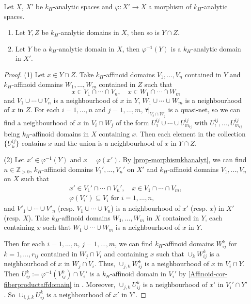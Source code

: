\begin{proposition}\label{prop-analyticdomainprop}
    Let $X$, $X'$ be $k_H$-analytic spaces and $\varphi:X'\rightarrow X$ a morphism of $k_H$-analytic spaces. 
    \begin{enumerate}
        \item Let $Y,Z$ be $k_H$-analytic domains in $X$, then so is $Y\cap Z$.
        \item Let $Y$ be a $k_H$-analytic domain in $X$, then $\varphi^{-1}(Y)$ is a $k_H$-analytic domain in $X'$. 
    \end{enumerate}
\end{proposition}
\begin{proof}
    (1) Let $x\in Y\cap Z$. Take $k_H$-affinoid domains $V_1,\ldots,V_n$ contained in $Y$ and $k_H$-affinoid domains $W_1,\ldots,W_m$ contained in $Z$ such that
    \[
        x\in V_1\cap \cdots\cap V_n,\quad x\in W_1\cap \cdots \cap W_m
    \]
    and $V_1\cup\cdots\cup V_n$ is a neighbourhood of $x$ in $Y$, $W_1\cup\cdots\cup W_m$ is a neighbourhood of $x$ in $Z$. For each $i=1,\ldots,n$ and $j=1,\ldots,m$, $\hat{\tau}|_{V_i\cap W_j}$ is a quasi-net, so we can find a neighbourhood of $x$ in $V_{i}\cap W_j$ of the form $U^{ij}_1\cup \cdots\cup U^{ij}_{m_{ij}}$ with $U^{ij}_1,\ldots,U^{ij}_{m_{ij}}$ being $k_H$-affinoid domains in $X$ containing $x$. Then each element in the collection $\{U^{ij}_k\}$ contains $x$ and the union is a neighbourhood of $x$ in $Y\cap Z$.

    (2) Let $x'\in \varphi^{-1}(Y)$ and $x=\varphi(x')$.
    By \cref{prop-morphismkhanalyt}, we can find $n\in \mathbb{Z}_{>0}$, $k_H$-affinoid domains $V_1',\ldots,V_n'$ on $X'$ and $k_H$-affinoid domains $V_1,\ldots,V_n$ on $X$ such that 
    \[
        \begin{aligned}
        x'\in V_1'\cap \cdots\cap V_n',\quad x\in V_1\cap \cdots\cap V_m,  \\
        \varphi(V_i')\subseteq V_i\text{ for }i=1,\ldots,n,
        \end{aligned}
    \]
    and $V'_1\cup\cdots\cup V'_n$ (resp. $V_1\cup\cdots\cup V_n$) is a neighbourhood of $x'$ (resp. $x$) in $X'$ (resp. $X$). 
    Take $k_H$-affinoid domains $W_1,\ldots,W_m$ in $X$ contained in $Y$, each containing $x$ such that $W_1\cup\cdots\cup W_m$ is a neighbourhood of $x$ in $Y$. 
    
    Then for each $i=1,\ldots,n$, $j=1,\ldots,m$, we can find $k_H$-affinoid domains $W_{ij}^k$ for $k=1,\ldots,r_{ij}$ contained in $W_j\cap V_i$ and  containing $x$ such that $\cup_k W_{ij}^k$ is a neighbourhood of $x$ in $W_j\cap V_i$. Thus, $\cup_{j,k} W_{ij}^k$ is a neighbourhood of $x$ in $V_i\cap Y$.
    Then $U_{ij}^k:=\varphi^{-1}(V_{ij}^k)\cap V_{i}'$ is a $k_H$-affinoid domain in $V_i'$ by \cref{Affinoid-cor-fiberproductaffdomain} in . Moreover, $\cup_{j,k} U_{ij}^k$ is a neighbourhood of $x'$ in $V_i'\cap Y'$. So $\cup_{i,j,k} U_{ij}^k$ is a neighbourhood of $x'$ in $Y'$.
\end{proof}

